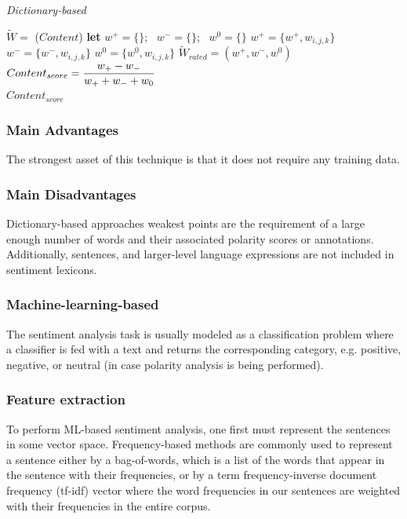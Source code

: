 \begin{algorithm}[H]
\caption{\textit{Dictionary-based}}
\label{array-sum}
\begin{algorithmic}[1]
\State $\tilde{W} = $  ($Content$)
    \State \textbf{let} $w^+ = \lbrace \rbrace$; \ $w^- = \lbrace \rbrace$; \ $w^0 = \lbrace \rbrace$
       \State $w^+ = \lbrace w^+,w_{i,j,k}\rbrace$
        \State $w^- = \lbrace w^-,w_{i,j,k}\rbrace$
    \Else  
        \State $w^0 = \lbrace w^0,w_{i,j,k}\rbrace$
    \EndIf
\EndFor
    \State $\tilde{W}_{rated} = (w^+,w^-,w^0)$
\EndFunction
{}
\State $Content_{score} = {\scriptsize{\dfrac{w_+ - w_-}{w_+ + w_- + w_0}}}$
\EndFunction \\
\Return ${Content_{score}}$
\EndProcedure
\end{algorithmic}
\end{algorithm}

\subsubsection{Main Advantages}
The strongest asset of this technique is that it does not require any training data.

\subsubsection{Main Disadvantages}
Dictionary-based approaches weakest points are the requirement of a large enough number of words and their associated polarity scores or annotations. Additionally, sentences, and larger-level language expressions are not included in sentiment lexicons. 

\subsubsection{Machine-learning-based}
The sentiment analysis task is usually modeled as a classification problem where a classifier is fed with a text and returns the corresponding category, e.g. positive, negative, or neutral (in case polarity analysis is being performed).

\subsubsection{Feature extraction}
To perform ML-based sentiment analysis, one first must represent the sentences in some vector space. Frequency-based methods are commonly used to represent a sentence either by a bag-of-words, which is a list of the words that appear in the sentence with their frequencies, or by a term frequency-inverse document frequency (tf-idf) vector where the word frequencies in our sentences are weighted with their frequencies in the entire corpus.


